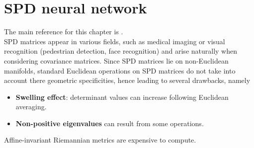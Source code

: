 \documentclass[10pt,a4paper]{book}
\theoremstyle{definition}
\theoremstyle{plain}
\theoremstyle{remark}
\begin{document}
\chapter{SPD neural network}
The main reference for this chapter is \cite{huang2017riemannian}. \\

SPD matrices appear in various fields, such as medical imaging or visual recognition (pedestrian detection, face recognition) and arise naturally when considering covariance matrices.
Since SPD matrices lie on non-Euclidean manifolds, standard Euclidean operations on SPD matrices do not take into account there geometric specificities, hence leading to several drawbacks, namely
\begin{itemize}
    \item \textbf{Swelling effect}: determinant values can increase following Euclidean averaging.
    \item \textbf{Non-positive eigenvalues} can result from some operations.
\end{itemize}
Affine-invariant Riemannian metrics are expensive to compute.
\end{document}
